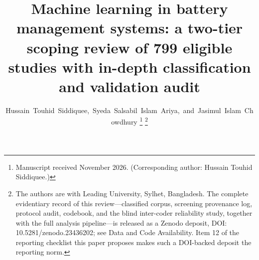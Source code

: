 \documentclass[journal]{IEEEtran}
\begin{document}
\title{Machine learning in battery management systems: a two-tier scoping review of 799 eligible studies with in-depth classification and validation audit}

\author{Hussain~Touhid~Siddiquee,~Syeda~Salsabil~Islam~Ariya,~and~Jasimul~Islam~Chowdhury%
\thanks{Manuscript received November 2026. (Corresponding author: Hussain Touhid Siddiquee.)}%
\thanks{The authors are with Leading University, Sylhet, Bangladesh. The complete evidentiary
record of this review---classified corpus, screening provenance log, protocol audit, codebook,
and the blind inter-coder reliability study, together with the full analysis pipeline---is
released as a Zenodo deposit, DOI: 10.5281/zenodo.23436202; see Data and Code
Availability. Item 12 of the reporting checklist this paper proposes makes such a DOI-backed
deposit the reporting norm.}}


\maketitle
\end{document}
